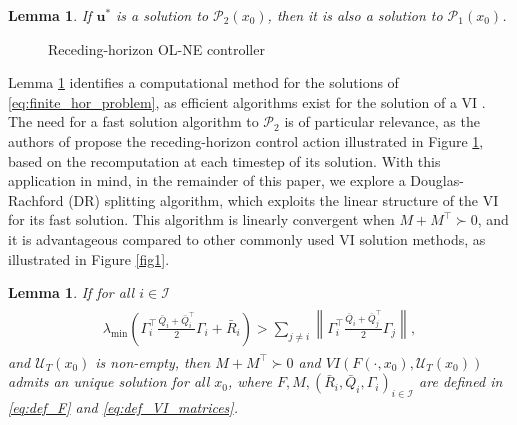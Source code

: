 \documentclass[letterpaper, 10 pt, conference]{ieeeconf}  %
\newcommand{\mc}{\mathcal}
\newcommand{\bu}{\boldsymbol{u}}
\newtheorem{lemma}[theorem]{Lemma}
\begin{document}
\begin{lemma}\cite[Proposition 1?]{benenati2024linear}\label{lem: OL-NE as VI}
    If $\bu^*$ is a solution to $\mc P_2(x_0)$, then it is also a solution to  $\mc P_1(x_0)$.
\end{lemma}

\begin{figure}
    \centering
    \centering\resizebox{.7\columnwidth}{!}{}
    \caption{Receding-horizon OL-NE controller}
    \label{fig:block_scheme}
\end{figure}


Lemma \ref{lem: OL-NE as VI} identifies a computational method for the solutions of \eqref{eq:finite_hor_problem}, as efficient algorithms exist for the solution of a VI \cite{facchinei2003finite}. The need for a fast solution algorithm to $\mc P_2$ is of particular relevance, as the authors of \cite{benenati2024linear} propose the receding-horizon control action illustrated in Figure \ref{fig:block_scheme}, based on the recomputation at each timestep of its solution. With this application in mind, in the remainder of this paper, we explore a Douglas-Rachford (DR) splitting algorithm, which exploits the linear structure of the VI for its fast solution. This algorithm is linearly convergent \cite[Proposition 6]{ferris1996operator} when $M+M^{\top}\succ 0$, and it is advantageous compared to other commonly used VI solution methods, as illustrated in Figure \ref{fig1}.
\iffalse
\begin{lemma}
    If for all $i\in\mc I$
    \begin{align} \label{eq:gerschgorin_criterion}
    \begin{split}
    \lambda_{\text{min}}\left(\Gamma_i^{\top}\frac{\bar{Q}_i + \bar{Q}_i^{\top}}{2}\Gamma_i + \bar{R}_i\right) > \sum_{j\neq i} \left\| \Gamma_i^\top\frac{\bar{Q}_i+\bar{Q}_j^{\top}}{2}\Gamma_j \right\|,
    \end{split}
\end{align}
    and $\mc U_T(x_0)$ is non-empty, then $M+M^{\top}\succ 0$ and $VI(F(\cdot, x_0), \mc U_T(x_0))$ admits an unique solution for all $x_0$, where $F,M, (\bar{R}_i,\bar{Q}_i, \Gamma_i)_{i\in\mc I}$ are defined in \eqref{eq:def_F} and \eqref{eq:def_VI_matrices}.
\end{lemma}
\end{document}
